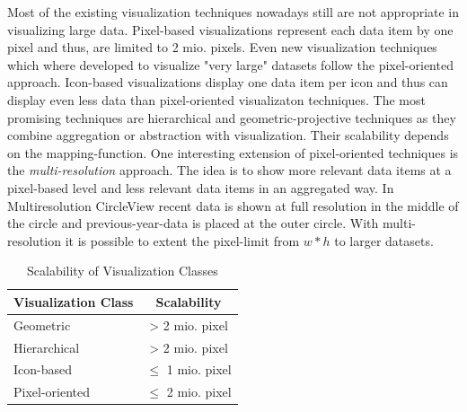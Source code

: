 Most of the existing visualization techniques nowadays still are not appropriate in visualizing large data. Pixel-based visualizations represent each data item by one pixel and thus, are limited to 2 mio. pixels. Even new visualization techniques which where developed to visualize "very large" datasets follow the pixel-oriented approach\cite{Keim1995, Keim1996}. Icon-based visualizations display one data item per icon and thus can display even less data than pixel-oriented visualizaton techniques. The most promising techniques are hierarchical and geometric-projective techniques as they combine aggregation or abstraction with visualization. Their scalability depends on the mapping-function. 
One interesting extension of pixel-oriented techniques is the \textit{multi-resolution} approach\cite{Keim2005}. The idea is to show more relevant data items at a pixel-based level and less relevant data items in an aggregated way. In Multiresolution CircleView recent data is shown at full resolution in the middle of the circle and previous-year-data is placed at the outer circle. With multi-resolution it is possible to extent the pixel-limit from $w*h$ to larger datasets. 

\begin{table}[H]
	\centering
	\caption{Scalability of Visualization Classes}
	\label{vizScalability}
	\begin{tabu}{ l | c }
	\toprule
	Visualization Class & Scalability\\
	\midrule
	Geometric &   > 2 mio. pixel\\
	Hierarchical &  > 2 mio. pixel \\
	Icon-based &  $\leq$ 1 mio. pixel \\
	Pixel-oriented &  $\leq$ 2 mio. pixel \\	
	\bottomrule
	\end{tabu}
\end{table}



